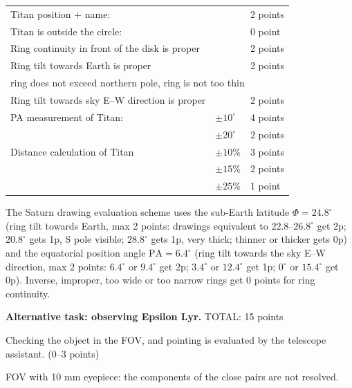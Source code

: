 \begin{center}
\begin{tabular}{lll}
Titan position + name: & & 2 points \\
Titan is outside the circle: & & 0 point \\[4pt]
Ring continuity in front of the disk is proper & & 2 points \\
Ring tilt towards Earth is proper & & 2 points \\
\multicolumn{3}{l}{\quad ring does not exceed northern pole, ring is not too thin} \\
Ring tilt towards sky E--W direction is proper & & 2 points \\[4pt]
PA measurement of Titan: & $\pm 10^\circ$ & 4 points \\
 & $\pm 20^\circ$ & 2 points \\[4pt]
Distance calculation of Titan & $\pm 10$\% & 3 points \\
 & $\pm 15$\% & 2 points \\
 & $\pm 25$\% & 1 point \\
\end{tabular}
\end{center}

The Saturn drawing evaluation scheme uses the sub-Earth latitude
$\Phi = 24.8^\circ$ (ring tilt towards Earth, max 2 points: drawings
equivalent to $22.8$--$26.8^\circ$ get 2p; $20.8^\circ$ gets 1p, S pole
visible; $28.8^\circ$ gets 1p, very thick; thinner or thicker gets 0p) and
the equatorial position angle $\mathrm{PA} = 6.4^\circ$ (ring tilt towards
the sky E--W direction, max 2 points: $6.4^\circ$ or $9.4^\circ$ get 2p;
$3.4^\circ$ or $12.4^\circ$ get 1p; $0^\circ$ or $15.4^\circ$ get 0p).
Inverse, improper, too wide or too narrow rings get 0 points for ring
continuity.


\medskip
\textbf{Alternative task: observing Epsilon Lyr.} \hfill TOTAL: 15 points

Checking the object in the FOV, and pointing is evaluated by the telescope
assistant. \hfill(0--3 points)

FOV with 10 mm eyepiece: the components of the close pairs are not resolved.


